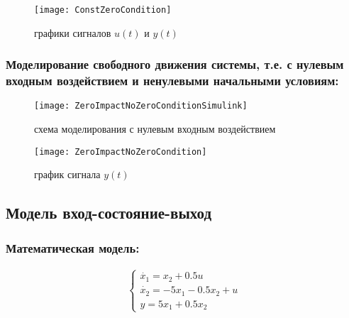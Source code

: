 \begin{figure}[H]
	\begin{center}
		\texttt{[image: ConstZeroCondition]}
		\caption{графики сигналов $u(t)$ и $y(t)$} 
		\label{pic:pic_4} %
	\end{center}
\end{figure}

\subsubsection{Моделирование свободного движения системы, т.е. с нулевым входным воздействием и ненулевыми начальными условиям:}

\begin{figure}[H]
	\begin{center}
		\texttt{[image: ZeroImpactNoZeroConditionSimulink]}
		\caption{схема моделирования с нулевым входным воздействием} 
		\label{pic:pic_5} %
	\end{center}
\end{figure}

\begin{figure}[H]
	\begin{center}
		\texttt{[image: ZeroImpactNoZeroCondition]}
		\caption{график сигнала $y(t)$} 
		\label{pic:pic_6} %
	\end{center}
\end{figure}

\newpage

\subsection{Модель вход-состояние-выход}
\subsubsection{Математическая модель:}

\begin{equation}
    \begin{matrix}
    \left\{
    \begin{matrix}
    \dot{x_1} = x_2 + 0.5u\\
    \dot{x_2} = -5x_1 - 0.5x_2 + u\\
    y = 5x_1 + 0.5x_2
    \end{matrix} \right.
    \end{matrix}
\end{equation}


